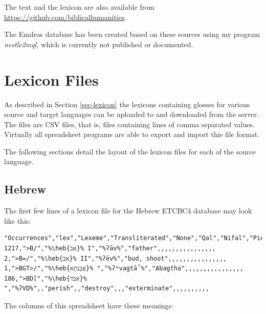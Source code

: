 \documentclass[11pt,oneside,a4paper]{memoir}
\newcommand{\heb}[1]{{\RL {\ezr #1}}}
\begin{document}
The text and the lexicon are also available from \url{https://github.com/biblicalhumanities}.

The Emdros database has been created based on these sources using my program
\emph{nestle2mql,} which is currently not published or documented.


\chapter{Lexicon Files}\label{app-lex}

As described in Section \ref{sec-lexicon} the lexicons containing glosses for various source and
target languages can be uploaded to and downloaded from the server. The files are CSV files, that
is, files containing lines of comma separated values. Virtually all spreadsheet programs are able to
export and import this file format.

The following sections detail the layout of the lexicon files for each of the source language.

\section{Hebrew}

The first few lines of a lexicon file for the Hebrew ETCBC4 database may look like this:



\begin{lstlisting}[basicstyle={\footnotesize\dvsm}]
"Occurrences","lex","Lexeme","Transliterated","None","Qal","Nifal","Piel","Pual",%\ldots%
1217,">B/","%\heb{אָב}% I","%ʔāv%","father",,,,,,,,,,,,,,,,
2,">B=/","%\heb{אֵב}% II","%ʔēv%","bud, shoot",,,,,,,,,,,,,,,,
1,">BGT>/","%\heb{אֲבַגְתָא}% ","%ʔᵃvagtāˀ%","Abagtha",,,,,,,,,,,,,,,,
186,">BD[","%\heb{אבד}% ","%ʔVD%",,"perish",,"destroy",,,"exterminate",,,,,,,,,,
\end{lstlisting}

The columns of this spreadsheet have these meanings:
\end{document}
